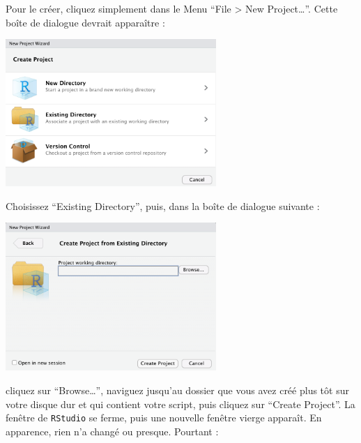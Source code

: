 \documentclass[
  a4paper,
  DIV=11,
  numbers=noendperiod,
  oneside]{scrreprt}
\begin{document}
Pour le créer, cliquez simplement dans le Menu ``File \textgreater{} New
Project\ldots{}''. Cette boîte de dialogue devrait apparaître :

\begin{center}
\includegraphics[width=0.6\textwidth,height=\textheight]{images/Rproj1.png}
\end{center}

Choisissez ``Existing Directory'', puis, dans la boîte de dialogue
suivante :

\begin{center}
\includegraphics[width=0.6\textwidth,height=\textheight]{images/Rproj2.png}
\end{center}

cliquez sur ``Browse\ldots{}'', naviguez jusqu'au dossier que vous avez
créé plus tôt sur votre disque dur et qui contient votre script, puis
cliquez sur ``Create Project''. La fenêtre de \texttt{RStudio} se ferme,
puis une nouvelle fenêtre vierge apparaît. En apparence, rien n'a changé
ou presque. Pourtant :
\end{document}
